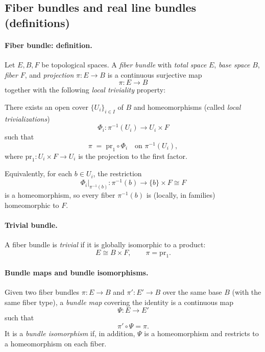 \documentclass[12pt,a4paper]{article}
\theoremstyle{plain}
\theoremstyle{definition}      %
\begin{document}

\subsection*{Fiber bundles and real line bundles (definitions)}

\paragraph{Fiber bundle: definition.}
Let $E,B,F$ be topological spaces. A \emph{fiber bundle} with \emph{total space} $E$,
\emph{base space} $B$, \emph{fiber} $F$, and \emph{projection} $\pi:E\to B$ is a continuous
surjective map
\[
\pi:E\longrightarrow B
\]
together with the following \emph{local triviality} property:

There exists an open cover $\{U_i\}_{i\in I}$ of $B$ and homeomorphisms (called
\emph{local trivializations})
\[
\Phi_i:\pi^{-1}(U_i)\longrightarrow U_i\times F
\]
such that
\[
\pi \;=\; \mathrm{pr}_1\circ \Phi_i\quad\text{on }\pi^{-1}(U_i),
\]
where $\mathrm{pr}_1:U_i\times F\to U_i$ is the projection to the first factor.

Equivalently, for each $b\in U_i$, the restriction
\[
\Phi_i\big|_{\pi^{-1}(b)}:\pi^{-1}(b)\longrightarrow \{b\}\times F \cong F
\]
is a homeomorphism, so every fiber $\pi^{-1}(b)$ is (locally, in families) homeomorphic
to $F$.

\paragraph{Trivial bundle.}
A fiber bundle is \emph{trivial} if it is globally isomorphic to a product:
\[
E\cong B\times F,\qquad \pi=\mathrm{pr}_1.
\]

\paragraph{Bundle maps and bundle isomorphisms.}
Given two fiber bundles $\pi:E\to B$ and $\pi':E'\to B$ over the same base $B$ (with the
same fiber type), a \emph{bundle map} covering the identity is a continuous map
\[
\Psi:E\to E'
\]
such that
\[
\pi' \circ \Psi = \pi.
\]
It is a \emph{bundle isomorphism} if, in addition, $\Psi$ is a homeomorphism and restricts
to a homeomorphism on each fiber.
\end{document}
